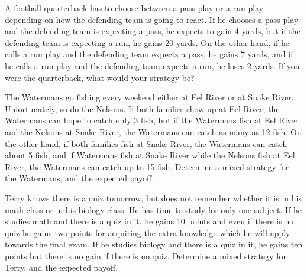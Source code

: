 \begin{puzzle}
    A football quarterback has to choose between a pass play or a run play depending on how the defending team is going to react. If he chooses a pass play and the defending team is expecting a pass, he expects to gain 4 yards, but if the defending team is expecting a run, he gains 20 yards. On the other hand, if he calls a run play and the defending team expects a pass, he gains 7 yards, and if he calls a run play and the defending team expects a run, he loses 2 yards. If you were the quarterback, what would your strategy be?
\end{puzzle}

\begin{puzzle}
    The Watermans go fishing every weekend either at Eel River or at Snake River. Unfortunately, so do the Nelsons. If both families show up at Eel River, the Watermans can hope to catch only 3 fish, but if the Watermans fish at Eel River and the Nelsons at Snake River, the Watermans can catch as many as 12 fish. On the other hand, if both families fish at Snake River, the Watermans can catch about 5 fish, and if Watermans fish at Snake River while the Nelsons fish at Eel River, the Watermans can catch up to 15 fish. Determine a mixed strategy for the Watermans, and the expected payoff.
\end{puzzle}

\begin{puzzle}
    Terry knows there is a quiz tomorrow, but does not remember whether it is in his math class or in his biology class. He has time to study for only one subject. If he studies math and there is a quiz in it, he gains 10 points and even if there is no quiz he gains two points for acquiring the extra knowledge which he will apply towards the final exam. If he studies biology and there is a quiz in it, he gains ten points but there is no gain if there is no quiz. Determine a mixed strategy for Terry, and the expected payoff.
\end{puzzle}

